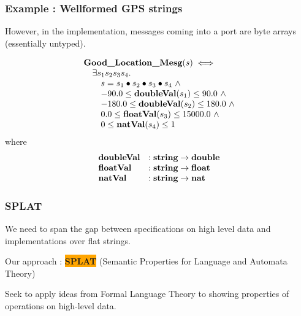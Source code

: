 \documentclass{beamer}
\newcommand{\kemph}[1]{\colorbox{orange}{#1}}
\newcommand{\konst}[1]{\ensuremath{\mbox{\bf{#1}}}}
\begin{document}
\begin{frame}\frametitle{Example : Wellformed GPS strings}

However, in the implementation, messages coming into a port are byte
arrays (essentially untyped).

\[
\begin{array}{l}
 \konst{Good\_Location\_Mesg} (s) \iff \\
\quad   \exists s_1 s_2 s_3 s_4. \\
\qquad      s = s_1 \bullet s_2 \bullet s_3 \bullet s_4 \ \land \\
\qquad    -90.0 \leq \konst{doubleVal}(s_1) \leq 90.0 \ \land \\
\qquad   -180.0 \leq \konst{doubleVal}(s_2) \leq 180.0 \ \land \\
\qquad      0.0 \leq \konst{floatVal}(s_3)  \leq 15000.0 \ \land \\
\qquad        0 \leq \konst{natVal}(s_4) \leq 1
\end{array}
\]
%
\noindent where
%
\[
\begin{array}{ll}
 \konst{doubleVal} & : \konst{string} \to \konst{double} \\
 \konst{floatVal}  & : \konst{string} \to \konst{float}  \\
 \konst{natVal}    & : \konst{string} \to \konst{nat}  \\
\end{array}
\]

\end{frame}

\begin{frame}\frametitle{SPLAT}

We need to span the gap between specifications on high level data and
implementations over flat strings.

Our approach : \kemph{\textbf{SPLAT}} (Semantic Properties for Language and Automata Theory)

Seek to apply ideas from Formal Language Theory to showing properties
of operations on high-level data.

\end{frame}
\end{document}
